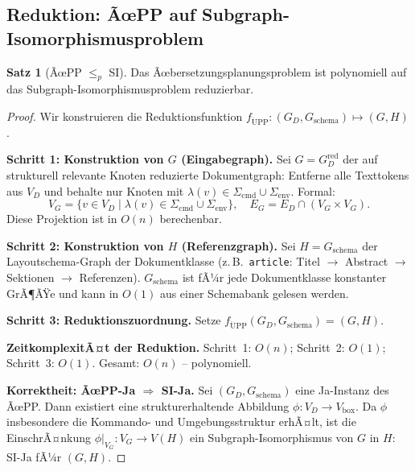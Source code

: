 ﻿\documentclass[a4paper,12pt]{article}
\theoremstyle{definition}
\newtheorem{satz}{Satz}
\begin{document}
\subsection{Reduktion: ÃœPP auf Subgraph-Isomorphismusproblem}
\label{sec:ltx-reduktion}

\begin{satz}[ÃœPP $\leq_p$ SI]
	\label{satz:ltx-reduktion}
	Das Ãœbersetzungsplanungsproblem ist polynomiell auf das
	Subgraph-Isomorphismusproblem reduzierbar.
\end{satz}

\begin{proof}
	Wir konstruieren die Reduktionsfunktion
	$f_{\mathrm{\ddot{U}PP}}: (G_D, G_{\mathrm{schema}}) \mapsto (G, H)$.
	
	\medskip
	\textbf{Schritt 1: Konstruktion von $G$ (Eingabegraph).}
	Sei $G = G_D^{\mathrm{red}}$ der auf strukturell relevante Knoten
	reduzierte Dokumentgraph: Entferne alle Texttokens aus $V_D$ und behalte
	nur Knoten mit $\lambda(v) \in \Sigma_{\mathrm{cmd}} \cup \Sigma_{\mathrm{env}}$.
	Formal:
	\[
	V_G = \{v \in V_D \mid \lambda(v) \in \Sigma_{\mathrm{cmd}} \cup \Sigma_{\mathrm{env}}\},
	\quad
	E_G = E_D \cap (V_G \times V_G).
	\]
	Diese Projektion ist in $O(n)$ berechenbar.
	
	\medskip
	\textbf{Schritt 2: Konstruktion von $H$ (Referenzgraph).}
	Sei $H = G_{\mathrm{schema}}$ der Layoutsche\-ma-Graph der Dokumentklasse
	(z.\,B.~\texttt{article}: Titel $\to$ Abstract $\to$ Sektionen $\to$
	Referenzen). $G_{\mathrm{schema}}$ ist fÃ¼r jede Dokumentklasse konstanter
	GrÃ¶ÃŸe und kann in $O(1)$ aus einer Schemabank gelesen werden.
	
	\medskip
	\textbf{Schritt 3: Reduktionszuordnung.}
	Setze $f_{\mathrm{\ddot{U}PP}}(G_D, G_{\mathrm{schema}}) = (G, H)$.
	
	\medskip
	\textbf{ZeitkomplexitÃ¤t der Reduktion.}
	Schritt~1: $O(n)$; Schritt~2: $O(1)$; Schritt~3: $O(1)$.
	Gesamt: $O(n)$ -- polynomiell. 
	
	\medskip
	\textbf{Korrektheit: ÃœPP-Ja $\Rightarrow$ SI-Ja.}
	Sei $(G_D, G_{\mathrm{schema}})$ eine Ja-Instanz des ÃœPP. Dann existiert
	eine strukturerhaltende Abbildung $\phi: V_D \to V_{\mathrm{box}}$.
	Da $\phi$ insbesondere die Kommando- und Umgebungsstruktur erhÃ¤lt, ist
	die EinschrÃ¤nkung $\phi|_{V_G}: V_G \to V(H)$ ein Subgraph-Isomorphismus
	von $G$ in $H$: SI-Ja fÃ¼r $(G, H)$.
	

\end{proof}
\end{document}
